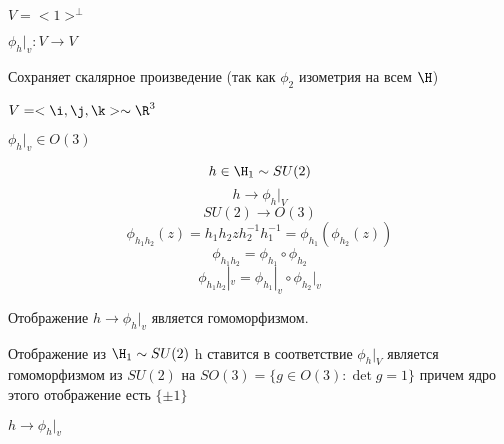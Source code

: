 $V = <1>^\bot$

$\phi_h|_v \colon V \to V$

Сохраняет скалярное произведение (так как $\phi_2$ изометрия на всем $\H$)

$V = <\i, \j, \k> \sim \R^3$

$\phi_h|_v \in O(3)$

$$h \in \H_1 \sim SU(2)$$
$$h \to \phi_h|_V$$
$$SU(2) \to O(3)$$
$$\phi_{h_1h_2}(z) = h_1h_2zh_2^{-1}h_1^{-1} = \phi_{h_1}(\phi_{h_2}(z))$$
$$\phi_{h_1h_2} = \phi_{h_1}\circ \phi_{h_2}$$
$$\phi_{h_1h_2}|_v = \phi_{h_1}|_v \circ \phi_{h_2}|_v $$

Отображение $h \to \phi_h|_v$ является гомоморфизмом.

\begin{theorem}
    Отображение из $\H_1 \sim SU(2)$  h ставится
    в соответствие $\phi_h|_V$  является гомоморфизмом из
    $SU(2)$ на $SO(3) = \{g \in O(3) \colon \det g = 1\}$
    причем ядро этого отображение есть $\{\pm1\}$

    $h \to \phi_h|_v$
\end{theorem}

